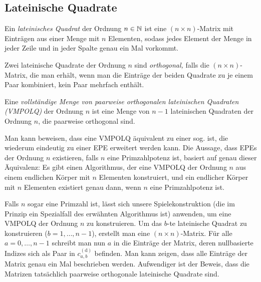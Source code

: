 \documentclass[paper=81mm:81mm,fontsize=10.7pt]{scrartcl}
\begin{document}
\subsection*{Lateinische Quadrate}

Ein \emph{lateinisches Quadrat} der Ordnung $n \in \mathbb{N}$ ist eine $(n \times n)$-Matrix
mit Einträgen aus einer Menge mit $n$ Elementen,
sodass jedes Element der Menge in jeder Zeile und in jeder Spalte genau ein Mal vorkommt.

Zwei lateinische Quadrate der Ordnung $n$ sind \emph{orthogonal,}
falls die $(n \times n)$-Matrix, die man erhält,
wenn man die Einträge der beiden Quadrate zu je einem Paar kombiniert,
kein Paar mehrfach enthält.

Eine \emph{vollständige Menge von paarweise orthogonalen lateinischen Quadraten (VMPOLQ)}
der Ordnung $n$ ist eine Menge von $n - 1$ lateinischen Quadraten der Ordnung $n$,
die paarweise orthogonal sind.

Man kann beweisen, dass eine VMPOLQ äquivalent zu einer sog.  ist,
die wiederum eindeutig zu einer EPE erweitert werden kann.
Die Aussage, dass EPEs der Ordnung $n$ existieren, falls $n$ eine Primzahlpotenz ist,
basiert auf genau dieser Äquivalenz:
Es gibt einen Algorithmus, der eine VMPOLQ der Ordnung $n$ aus einem endlichen Körper mit
$n$ Elementen konstruiert, und ein endlicher Körper mit $n$ Elementen existiert genau dann, wenn
$n$ eine Primzahlpotenz ist.

Falls $n$ sogar eine Primzahl ist, lässt sich unsere Spielekonstruktion
(die im Prinzip ein Spezialfall des erwähnten Algorithmus ist) anwenden,
um eine VMPOLQ der Ordnung $n$ zu konstruieren.
Um das $b$-te lateinische Quadrat zu konstruieren ($b = 1, \dotsc, n - 1$),
erstellt man eine $(n \times n)$-Matrix.
Für alle $a = 0, \dotsc, n - 1$ schreibt man nun $a$ in die Einträge der Matrix,
deren nullbasierte Indizes sich als Paar in $c^\mathrm{(d)}_{a,b}$ befinden.
Man kann zeigen, dass alle Einträge der Matrix genau ein Mal beschrieben werden.
Aufwendiger ist der Beweis, dass die Matrizen tatsächlich paarweise orthogonale
lateinische Quadrate sind.
\end{document}
